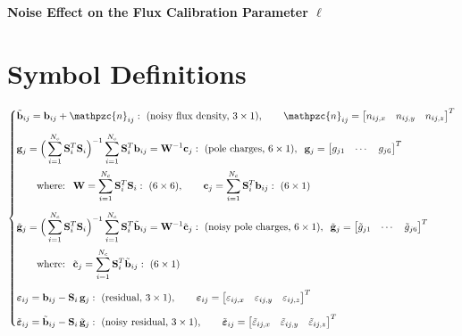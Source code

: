 \documentclass[11pt]{article}
\newcommand{\nn}{\mathpzc{n}}   %
\begin{document}
\begin{center}
{\LARGE\bfseries Noise Effect on the Flux Calibration Parameter $\hat{\ell}$}
\end{center}
\vspace{6pt}

\section*{Symbol Definitions}

\[
\left\{
\begin{aligned}
&\tilde{\mathbf{b}}_{ij}=\mathbf{b}_{ij}+\nn_{ij}:\ \text{(noisy flux density, $3\times1$)},\qquad
\nn_{ij}=\begin{bmatrix}n_{ij,x} & n_{ij,y} & n_{ij,z}\end{bmatrix}^{T}\\[6pt]
&\mathbf{g}_j=\Big(\sum_{i=1}^{N_c}\mathbf{S}_i^{T}\mathbf{S}_i\Big)^{-1}\sum_{i=1}^{N_c}\mathbf{S}_i^{T}\mathbf{b}_{ij}
=\mathbf{W}^{-1}\mathbf{c}_j:\ \text{(pole charges, $6\times1$)},\;\;
\mathbf{g}_j=\begin{bmatrix}g_{j1} & \cdots & g_{j6}\end{bmatrix}^{T}\\[2pt]
&\qquad\text{where: }\
\mathbf{W}=\sum_{i=1}^{N_c}\mathbf{S}_i^{T}\mathbf{S}_i:\ (6\times6),\qquad
\mathbf{c}_j=\sum_{i=1}^{N_c}\mathbf{S}_i^{T}\mathbf{b}_{ij}:\ (6\times1)\\[6pt]
&\tilde{\mathbf{g}}_j=\Big(\sum_{i=1}^{N_c}\mathbf{S}_i^{T}\mathbf{S}_i\Big)^{-1}\sum_{i=1}^{N_c}\mathbf{S}_i^{T}\tilde{\mathbf{b}}_{ij}
=\mathbf{W}^{-1}\tilde{\mathbf{c}}_j:\ \text{(noisy pole charges, $6\times1$)},\;\;
\tilde{\mathbf{g}}_j=\begin{bmatrix}\tilde{g}_{j1} & \cdots & \tilde{g}_{j6}\end{bmatrix}^{T}\\[2pt]
&\qquad\text{where: }\
\tilde{\mathbf{c}}_j=\sum_{i=1}^{N_c}\mathbf{S}_i^{T}\tilde{\mathbf{b}}_{ij}:\ (6\times1)\\[6pt]
&\boldsymbol{\varepsilon}_{ij}=\mathbf{b}_{ij}-\mathbf{S}_i\,\mathbf{g}_j:\ \text{(residual, $3\times1$)},\qquad
\boldsymbol{\varepsilon}_{ij}=\begin{bmatrix}\varepsilon_{ij,x} & \varepsilon_{ij,y} & \varepsilon_{ij,z}\end{bmatrix}^{T}\\[6pt]
&\tilde{\boldsymbol{\varepsilon}}_{ij}=\tilde{\mathbf{b}}_{ij}-\mathbf{S}_i\,\tilde{\mathbf{g}}_j:\ \text{(noisy residual, $3\times1$)},\qquad
\tilde{\boldsymbol{\varepsilon}}_{ij}=\begin{bmatrix}\tilde{\varepsilon}_{ij,x} & \tilde{\varepsilon}_{ij,y} & \tilde{\varepsilon}_{ij,z}\end{bmatrix}^{T}
\end{aligned}
\right.
\]
\end{document}
